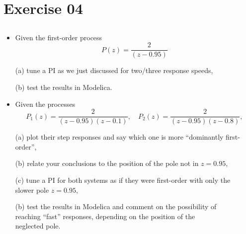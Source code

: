 \section{Exercise 04}
\subsection{}

\begin{frame}
\myPause
 \begin{itemize}[<+-| alert@+>]
 \item Given the first-order process
       \begin{displaymath}
        P(z) = \frac{2}{(z-0.95)}
       \end{displaymath}
 \item[(a)] tune a PI as we just discussed for two/three response speeds,
 \item[(b)] test the results in Modelica.
 \end{itemize}
\end{frame}

\begin{frame}
\myPause
 \begin{itemize}[<+-| alert@+>]
 \item Given the processes
       \begin{displaymath}
        P_1(z) = \frac{2}{(z-0.95)(z-0.1)}, \quad
        P_2(z) = \frac{2}{(z-0.95)(z-0.8)},
       \end{displaymath}
 \item[(a)] plot their step responses and say which one is more ``dominantly first-order'',
 \item[(b)] relate your conclusions to the position of the pole not in $z=0.95$,
 \item[(c)] tune a PI for both systems as if they were first-order with only the\\
            slower pole $z=0.95$,
 \item[(b)] test the results in Modelica and comment on the possibility of\\
            reaching ``fast'' responses, depending on the position of the\\
            neglected pole.
 \end{itemize}
\end{frame}
